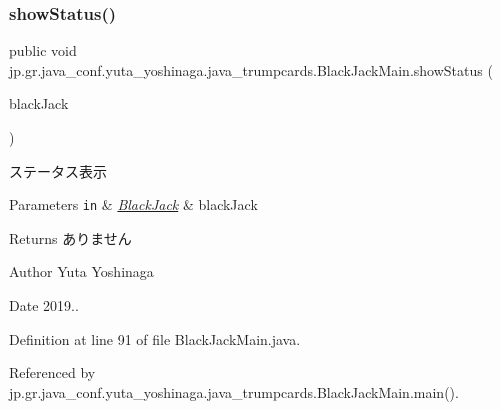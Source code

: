 \subsubsection{\texorpdfstring{show\+Status()}{showStatus()}}
{\footnotesize\ttfamily public void jp.\+gr.\+java\+\_\+conf.\+yuta\+\_\+yoshinaga.\+java\+\_\+trumpcards.\+Black\+Jack\+Main.\+show\+Status (\begin{DoxyParamCaption}\item[{\hyperlink{classjp_1_1gr_1_1java__conf_1_1yuta__yoshinaga_1_1java__trumpcards_1_1_black_jack}{Black\+Jack}}]{black\+Jack }\end{DoxyParamCaption})}



ステータス表示 


\begin{DoxyParams}[1]{Parameters}
\mbox{\tt in}  & {\em \hyperlink{classjp_1_1gr_1_1java__conf_1_1yuta__yoshinaga_1_1java__trumpcards_1_1_black_jack}{Black\+Jack}} & black\+Jack \\
\hline
\end{DoxyParams}
\begin{DoxyReturn}{Returns}
ありません 
\end{DoxyReturn}
\begin{DoxyAuthor}{Author}
Yuta Yoshinaga 
\end{DoxyAuthor}
\begin{DoxyDate}{Date}
2019.. 
\end{DoxyDate}


Definition at line 91 of file Black\+Jack\+Main.\+java.



Referenced by jp.\+gr.\+java\+\_\+conf.\+yuta\+\_\+yoshinaga.\+java\+\_\+trumpcards.\+Black\+Jack\+Main.\+main().

